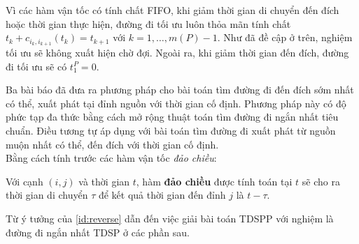 \documentclass[../main.tex]{subfiles}
\begin{document}
Vì các hàm vận tốc có tính chất FIFO, khi giảm thời gian di
chuyển đến đích hoặc thời gian thực hiện, đường đi tối ưu luôn thỏa mãn
tính chất \(t_k + c_{i_k, i_{k+1}}(t_k) = t_{k+1}\) với
\(k = 1, \dots, m(P)-1\). Như đã đề cập ở trên, nghiệm tối ưu sẽ không
xuất hiện chờ đợi. Ngoài ra, khi giảm thời gian đến đích, đường đi tối
ưu sẽ có \(t_1^P = 0\).

Ba bài báo \cite{cooke1966shortest,orda1990shortest,dean2004shortest} đã đưa ra phương pháp
cho bài toán tìm đường đi đến đích sớm nhất có thể,  xuất phát tại đỉnh nguồn với thời gian cố định. 
Phương pháp này có độ phức tạp đa thức bằng cách mở rộng thuật toán tìm đường đi ngắn nhất
tiêu chuẩn. Điều tương tự áp dụng với bài toán tìm đường đi 
xuất phát từ nguồn muộn nhất có thể, đến đích với thời gian cố định.
\\
Bằng cách tính trước các hàm vận tốc \emph{đảo chiều}:

\begin{definition}
\label{id:reverse}  
Với
cạnh \((i, j)\) và thời gian \(t\), hàm \textbf{đảo chiều} được tính toán
tại \(t\) sẽ cho ra thời gian di chuyển \(\tau\) để kết quả thời gian
đến đỉnh \(j\) là \(t-\tau\). 
\end{definition}

Từ ý tưởng của \autoref{id:reverse} dẫn đến việc giải bài toán
TDSPP với nghiệm là đường đi ngắn nhất TDSP ở các phần sau.

\backmatter
\end{document}
